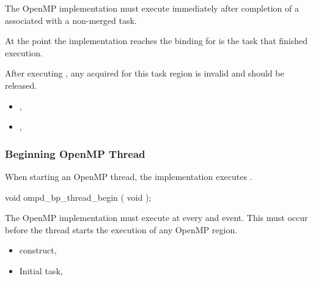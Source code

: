 The OpenMP implementation must execute  immediately
after completion of a  associated with a non-merged task.

At the point the implementation reaches 
the binding for 
is the task that finished execution.

After 
executing , any  acquired for this
task region is invalid and should be released.


\crossreferences
\begin{itemize}
\item
  , 
\item
  , 
\end{itemize}



\subsubsection{Beginning OpenMP Thread}
\label{subsubsec:ompd_bp_thread_begin}

\summary

When starting an OpenMP thread, the implementation executes
.

\format
\begin{cspecific}
\begin{ompSyntax}
void ompd_bp_thread_begin ( void );
\end{ompSyntax}
\end{cspecific}


\descr

The OpenMP implementation must execute 
 at every  and  event.
This must occur before the thread starts the execution of any
OpenMP region.

\crossreferences
\begin{itemize}
\item
   construct, 
\item
  Initial task, 
\end{itemize}



